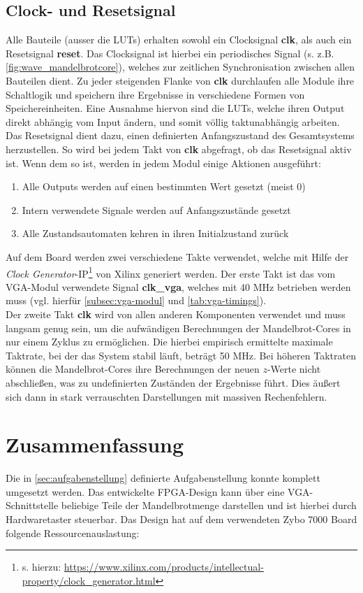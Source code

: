 \documentclass[a4paper,12pt,onesided]{report}
\begin{document}
\section{Clock- und Resetsignal}
Alle Bauteile (ausser die LUTs) erhalten sowohl ein Clocksignal \textbf{clk}, als auch ein Resetsignal \textbf{reset}.
Das Clocksignal ist hierbei ein periodisches Signal (s. z.B. \autoref{fig:wave_mandelbrotcore}), welches zur zeitlichen Synchronisation zwischen allen Bauteilen dient.
Zu jeder steigenden Flanke von \textbf{clk} durchlaufen alle Module ihre Schaltlogik und speichern ihre Ergebnisse in verschiedene Formen von Speichereinheiten.
Eine Ausnahme hiervon sind die LUTs, welche ihren Output direkt abhängig vom Input ändern, und somit völlig taktunabhängig arbeiten.\\
Das Resetsignal dient dazu, einen definierten Anfangszustand des Gesamtsystems herzustellen.
So wird bei jedem Takt von \textbf{clk} abgefragt, ob das Resetsignal aktiv ist.
Wenn dem so ist, werden in jedem Modul einige Aktionen ausgeführt:
\begin{enumerate}
	\item Alle Outputs werden auf einen bestimmten Wert gesetzt (meist 0)
	\item Intern verwendete Signale werden auf Anfangszustände gesetzt
	\item Alle Zustandsautomaten kehren in ihren Initialzustand zurück
\end{enumerate}
Auf dem Board werden zwei verschiedene Takte verwendet, welche mit Hilfe der \textit{Clock Generator}-IP\footnote{s. hierzu: \url{https://www.xilinx.com/products/intellectual-property/clock_generator.html}} von Xilinx generiert werden.
Der erste Takt ist das vom VGA-Modul verwendete Signal \textbf{clk\_vga}, welches mit 40 MHz betrieben werden muss (vgl. hierfür \autoref{subsec:vga-modul} und \autoref{tab:vga-timings}).\\
Der zweite Takt \textbf{clk} wird von allen anderen Komponenten verwendet und muss langsam genug sein, um die aufwändigen Berechnungen der Mandelbrot-Cores in nur einem Zyklus zu ermöglichen.
Die hierbei empirisch ermittelte maximale Taktrate, bei der das System stabil läuft, beträgt 50 MHz.
Bei höheren Taktraten können die Mandelbrot-Cores ihre Berechnungen der neuen $z$-Werte nicht abschließen, was zu undefinierten Zuständen der Ergebnisse führt.
Dies äußert sich dann in stark verrauschten Darstellungen mit massiven Rechenfehlern.

\chapter{Zusammenfassung}
Die in \autoref{sec:aufgabenstellung} definierte Aufgabenstellung konnte komplett umgesetzt werden.
Das entwickelte FPGA-Design kann über eine VGA-Schnittstelle beliebige Teile der Mandelbrotmenge darstellen und ist hierbei durch Hardwaretaster steuerbar.
Das Design hat auf dem verwendeten Zybo 7000 Board folgende Ressourcenauslastung:
\end{document}
